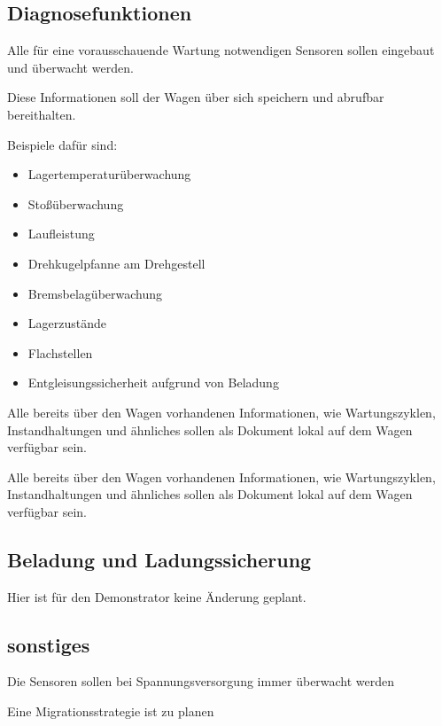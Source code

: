 \subsection{Diagnosefunktionen}
\begin{feat}
Alle für eine vorausschauende Wartung notwendigen Sensoren sollen eingebaut und überwacht werden. \par
Diese Informationen soll der Wagen über sich speichern und abrufbar bereithalten.
\end{feat}
\begin{rem}
Beispiele dafür sind:
\begin{itemize}
    \item Lagertemperaturüberwachung
    \item Stoßüberwachung
    \item Laufleistung
    \item Drehkugelpfanne am Drehgestell
    \item Bremsbelagüberwachung
    \item Lagerzustände
    \item Flachstellen
    \item Entgleisungssicherheit aufgrund von Beladung
\end{itemize}
\end{rem}
Alle bereits über den Wagen vorhandenen Informationen, wie Wartungszyklen, Instandhaltungen und ähnliches sollen als Dokument lokal auf dem Wagen  verfügbar sein.
\begin{feat}
Alle bereits über den Wagen vorhandenen Informationen, wie Wartungszyklen, Instandhaltungen und ähnliches sollen als Dokument lokal auf dem Wagen  verfügbar sein.
\end{feat}

\subsection{Beladung und Ladungssicherung}
Hier ist für den Demonstrator keine Änderung geplant.

\subsection{sonstiges}
\begin{feat}
Die Sensoren sollen bei Spannungsversorgung immer überwacht werden
\end{feat}
\begin{feat}
Eine Migrationsstrategie ist zu planen
\end{feat}